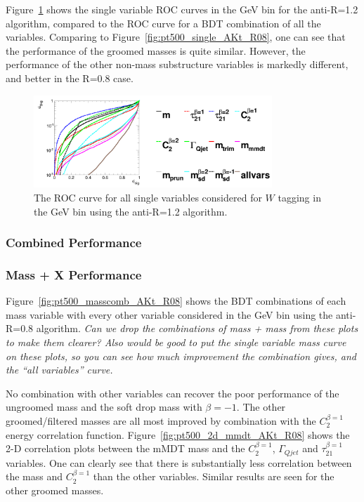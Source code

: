 Figure~\ref{fig:pt500_single_AKt_R12} shows the single variable ROC curves in
the  GeV bin for the anti-\kT R=1.2 algorithm, compared to the
ROC curve for a BDT combination of all the variables. Comparing to
Figure~\ref{fig:pt500_single_AKt_R08}, one can see that the
performance of the groomed masses is quite similar. However, the
performance of the other non-mass substructure variables is markedly
different, and better in the R=0.8 case.

\begin{figure}
\begin{center}
\includegraphics[width=0.8\textwidth]{./Figures/WTagging/pT500/AKtR12/Rocs_1D_single.png}
\caption{The ROC curve for all single variables considered for $W$
tagging in the  GeV bin using the anti-\kT R=1.2 algorithm.}
\label{fig:pt500_single_AKt_R12}
\end{center}
\end{figure}


\subsubsection{Combined Performance}

\subsubsection*{Mass + X Performance}

Figure~\ref{fig:pt500_masscomb_AKt_R08} shows the BDT combinations of each mass variable with every other
variable considered in the  GeV bin using the anti-\kT R=0.8
algorithm. {\it Can we drop the combinations of mass + mass
from these plots to make them clearer? Also would be good to put the
single variable mass curve on these plots, so you can see how much
improvement the combination gives, and the ``all variables'' curve.}

No combination with other variables can recover the poor performance
of the ungroomed mass and the soft drop mass with $\beta=-1$. The
other groomed/filtered masses are all most improved by combination
with the $C_{2}^{\beta=1}$ energy correlation
function. Figure~\ref{fig:pt500_2d_mmdt_AKt_R08} shows the 2-D
correlation plots between the mMDT mass and the $C_{2}^{\beta=1}$,
$\Gamma_{Qjet}$ and $\tau_{21}^{\beta=1}$ variables. One can clearly
see that there is substantially less correlation between the mass and
$C_{2}^{\beta=1}$ than the other variables. Similar results are seen
for the other groomed masses.

